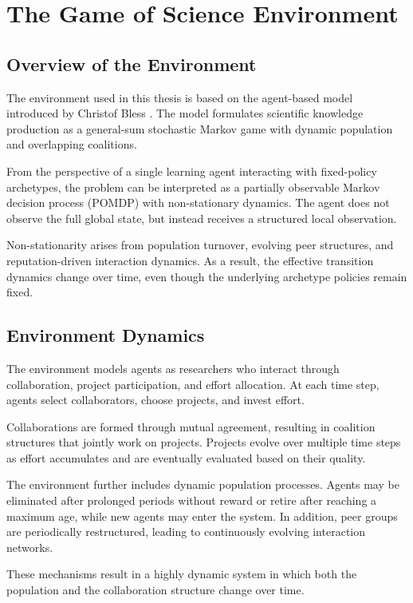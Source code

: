 \documentclass[english,bachelor]{hsluthesis}
\begin{document}
\section{The Game of Science Environment}

\subsection{Overview of the Environment}
The environment used in this thesis is based on the agent-based model introduced by Christof Bless \cite{bless_game_of_science_2026}. The model formulates scientific knowledge production as a general-sum stochastic Markov game with dynamic population and overlapping coalitions.

From the perspective of a single learning agent interacting with fixed-policy archetypes, the problem can be interpreted as a partially observable Markov decision process (POMDP) with non-stationary dynamics. The agent does not observe the full global state, but instead receives a structured local observation.

Non-stationarity arises from population turnover, evolving peer structures, and reputation-driven interaction dynamics. As a result, the effective transition dynamics change over time, even though the underlying archetype policies remain fixed.

\subsection{Environment Dynamics}
The environment models agents as researchers who interact through collaboration, project participation, and effort allocation. At each time step, agents select collaborators, choose projects, and invest effort.

Collaborations are formed through mutual agreement, resulting in coalition structures that jointly work on projects. Projects evolve over multiple time steps as effort accumulates and are eventually evaluated based on their quality.

The environment further includes dynamic population processes. Agents may be eliminated after prolonged periods without reward or retire after reaching a maximum age, while new agents may enter the system. In addition, peer groups are periodically restructured, leading to continuously evolving interaction networks.

These mechanisms result in a highly dynamic system in which both the population and the collaboration structure change over time.
\end{document}
